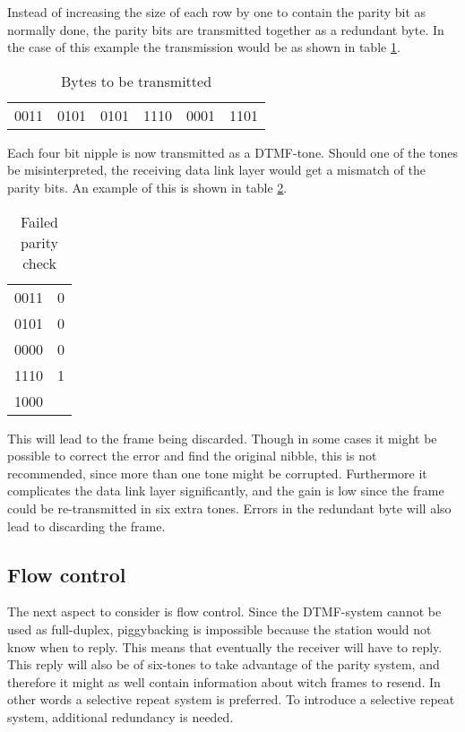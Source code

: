 Instead of increasing the size of each row by one to contain the parity bit as normally done, the parity bits are transmitted together as a redundant byte. In the case of this example the transmission would be as shown in table \ref{tab:bytes_to_be_transmitted}.

\begin{table}[htb]
	\centering
	\begin{tabular}{c|c|c|c|c|c}
	0011 & 0101 & 0101 & 1110 & 0001 & 1101 \\
	\end{tabular}
	\caption{Bytes to be transmitted}
	\label{tab:bytes_to_be_transmitted}
\end{table}

Each four bit nipple is now transmitted as a DTMF-tone. Should one of the tones
be misinterpreted, the receiving data link layer would get a mismatch of the
parity bits. An example of this is shown in table \ref{tab:failed_parity_check}.

\begin{table}[htb]
	\centering
	\begin{tabular}{c|c}
	0011 & 0 \\
	0101 & 0 \\
	0000 & 0 \\
	1110 & 1 \\
	\hline
	1000 & \\
	\end{tabular}
	\caption{Failed parity check}
	\label{tab:failed_parity_check}
\end{table}

This will lead to the frame being discarded. Though in some cases it might be
possible to correct the error and find the original nibble, this is not
recommended, since more than one tone might be corrupted. Furthermore it
complicates the data link layer significantly, and the gain is low since the
frame could be re-transmitted in six extra tones. Errors in the redundant byte
will also lead to discarding the frame.

\subsection{Flow control}
The next aspect to consider is flow control. Since the DTMF-system
cannot be used as full-duplex, piggybacking \cite[p. 339]{KOM} is impossible
because the station would not know when to reply. This means that eventually the
receiver will have to reply. This reply will also be of six-tones to take advantage of the parity system, and therefore it might
as well contain information about witch frames to resend. In other words a
selective repeat system is preferred. To introduce a selective repeat system,
additional redundancy is needed.


